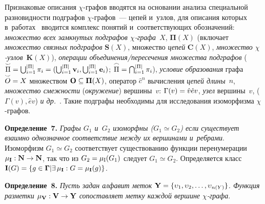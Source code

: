 \begin{multicols}{2}
     Признаковые описания $\chi$-гра\-фов вводятся на основании анализа 
специальной разновидности подграфов $\chi$-гра\-фов~--- цепей и~узлов, для 
описания которых в~работах~\cite{7-tr, 8-tr} вводится комплекс понятий 
и~соответствующих обозначений: \textit{множество всех замкнутых 
подграфов $\chi$-гра\-фа}~${X}$, $\boldsymbol{\Pi}({X})$ 
(включает \textit{множество связных подграфов} $\mathbf{S}(X)$, множество 
\textit{цепей} $\mathbf{C}(X)$, \textit{множество  
$\chi$-уз\-лов}~$\mathbf{K}(X)$), \textit{операции  
объеди\-не\-ния/пе\-ре\-се\-че\-ния множества подграфов} 
($\overset{\smile}{\Pi}\hm= \bigcup_{i=1}^{\vert\Pi\vert} \pi_i\hm= ( 
\bigcup_{i=1}^{\vert\Pi\vert} \mathbf{v}_i, \bigcup_{i=1}^{\vert\Pi\vert} 
\mathbf{e}_i)$; $\overset{\frown}{\Pi}\hm= \bigcap_{i=1}^{\vert\Pi\vert} 
\pi_i$), \textit{условие образования} графа $\overset{\smile}{{O}}\hm= 
{X}$ множеством $\mathbf{O}\hm\subseteq 
\boldsymbol{\Pi}({X})$, оператор $\hat{c}^n$ вычисления \textit{цепей 
длины}~$n$, \textit{множество смеж\-ности} (\textit{окружение}) 
вершины~$v$: $\Gamma(v)\hm= \hat{v}\hat{e} v$, \textit{узел} вершины~$v$, 
($\Gamma(v),\hat{e}v$) \textit{и др.}~\cite{7-tr}. Такие подграфы необходимы 
для исследования изоморфизма $\chi$-гра\-фов.
     
     \smallskip
     
     \noindent
     \textbf{Определение~7.} \textit{Графы $G_1$ и~$G_2$ изоморфны 
($G_1\simeq G_2$) если существует взаимно однозначное соответствие 
между их вершинами и~ребрами}. Изоморфизм $G_1\simeq G_2$ соответствует 
существованию функции перенумерации $\mu_{\mathbf{I}}: \mathbf{N}\hm\to 
\mathbf{N}$, так что из $G_2\hm=\mu_{\mathrm{I}}(G_1)$ следует $G_1\simeq 
G_2$. Определяется класс $\mathbf{\mathbf{I}}(G)\hm= \{ g\hm\in 
\boldsymbol{\Gamma}\vert \exists\,\mu_{\mathbf{I}}: G\hm= 
\mu_{\mathbf{I}}(g)\}$.
     
     \smallskip
     
     \noindent
     \textbf{Определение~8.} \textit{Пусть задан алфавит меток $\mathbf{Y}\hm= \{ 
\upsilon_1, \upsilon_2, \ldots, \upsilon_{n(Y)}\}$. Функция разметки $\mu_{\mathbf{V}}: 
\mathbf{V}\hm\to \mathbf{Y}$ сопоставляет метку каждой вершине $\chi$-графа}. 
     
     \smallskip
     

\end{multicols}
